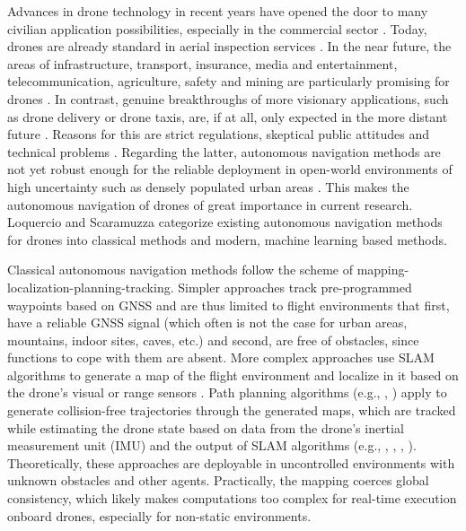 Advances in drone technology in recent years
have opened the door to many civilian application possibilities,
especially in the commercial sector \cite{Dunn}.
Today, drones are already standard in 
aerial inspection services \cite{Cohn, Equinox, Abuhasira}.
In the near future, the areas of
infrastructure,
transport,
insurance,
media and entertainment,
telecommunication,
agriculture,
safety
and mining 
are particularly promising for drones \cite{Mazur2016a}.
In contrast, 
genuine breakthroughs of more visionary applications, 
such as drone delivery or drone taxis,
are, if at all, only expected in the more distant future \cite{Rosen2019}.
Reasons for this are strict
regulations, skeptical public attitudes
and technical problems \cite{Rosen2019}.
Regarding the latter,
autonomous navigation methods are not yet 
robust enough for the reliable deployment in 
open-world environments of high uncertainty such as
densely populated urban areas \cite{brunner2019urban}.
This makes the autonomous navigation of drones
of great importance in current research.
Loquercio and Scaramuzza \cite{Loquercio2018a} 
categorize existing autonomous navigation methods for drones 
into classical methods and modern, machine learning based methods.

Classical autonomous navigation methods
follow the scheme of mapping-localization-planning-tracking.
Simpler approaches track pre-programmed waypoints based on GNSS
and are thus limited to flight environments that
first, have a reliable GNSS signal
(which often is not the case for 
urban areas, mountains, indoor sites, caves, etc.)
and second, are free of obstacles,
since functions to cope with them are absent.
More complex approaches use SLAM algorithms
to generate a map of the flight environment
and localize in it
based on the drone's visual or range sensors \cite{MurArtal2015}.
Path planning algorithms 
(e.g., \cite{Bircher2016}, \cite{Cieslewski2017})
apply to generate collision-free 
trajectories through the generated maps,
which are tracked
while estimating the drone state
based on data from the drone's inertial measurement unit (IMU)
and the output of SLAM algorithms 
(e.g., \cite{Lin2017}, \cite{Scaramuzza2014}, \cite{Sa2018}, \cite{Loianno2017}).
Theoretically, these approaches are deployable
in uncontrolled environments with unknown obstacles and other agents.
Practically, 
the mapping coerces global consistency,
which likely makes computations too complex 
for real-time execution onboard drones,
especially for non-static environments.

